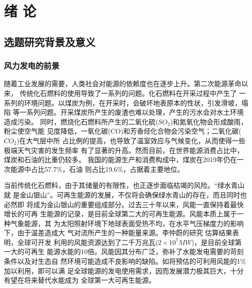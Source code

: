 \documentclass[AutoFakeBold]{LZUThesis}
\begin{document}
\chapter{绪 \qquad 论}


\section{选题研究背景及意义}
\subsection{风力发电的前景}
随着工业发展的需要，人类社会对能源的依赖度也在逐步上升。第二次能源革命以来，
传统化石燃料的使用导致了一系列的问题。化石燃料在开采过程中产生了
一系列的环境问题。以煤炭为例，在开采时，会破坏地表原本的性状，引发滑坡，塌陷
等一系列问题。开采煤炭所产生的废渣也难以处理，产生的污水会对水土环境造成污染。
同时，燃烧化石燃料所产生的二氧化硫($SO_2$)和氮氧化物会形成酸雨，粉尘使空气能
见度降低，一氧化碳(CO)和芳香烃化合物会污染空气；二氧化碳($CO_2$)在大气层中所
占比例的提高，也导致了温室效应与气候变化，从而使得一些极端天气灾害的发生频率
有了显著的升高。然而目前，在世界能源消费占比中，煤炭和石油的比重仍较多。
我国的能源生产和消费构成中，煤炭在2019年仍在一次能源中占比57.7\%，石油
则占比19.6\%，占据着主要地位。

当前传统化石燃料，由于其储量的有限性，也正逐步面临枯竭的风险。“绿水青山就
是金山银山”。可再生能源的发展，不仅将会确保绿水青山的存在，而且同时也必然即
将成为金山银山的重要组成部分。过去三十年以来，风能一直保持着最快增长的可再
生能源的记录，是目前全球第二大的可再生能源。风能本质上属于一种气象能源，其
为太阳照射环境下地球表面受热不均，在水平气压梯度力的影响下，由于温差造成大
气对流所产生的一种能量来源。李仲蔚的研究
估算结果表明，全球可开发
利用的风能资源达到了二千万兆瓦($2\times10^7MW$)，是目前全球第一大的可再生
能源水能的10倍。风能因其分布广泛，弥补了水能发电需要的苛刻条件以及对生态自
然环境可能造成不良影响的缺陷。如将预估的可利用风能的1\%加以利用，即可以满
足全球能源的发电使用需求，因而发展潜力极其巨大，十分有望在将来替代水能成为
全球第一大可再生能源。
\end{document}
